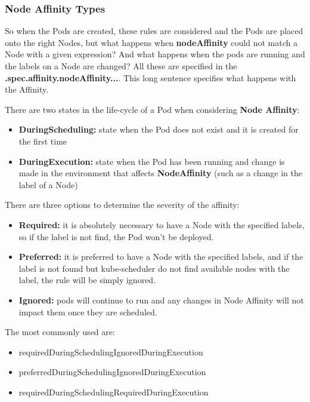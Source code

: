 \documentclass{article}
\begin{document}
\subsubsection{Node Affinity Types}

So when the Pods are created, these rules are considered and the Pods are placed onto the right Nodes, but what happens when \textbf{nodeAffinity} could not match a Node with a given expression? And what happens when the pods are running and the labels on a Node are changed? All these are specified in the \textbf{.spec.affinity.nodeAffinity...}. This long sentence specifies what happens with the Affinity.

There are two states in the life-cycle of a Pod when considering \textbf{Node Affinity}:
\begin{itemize}
    \item \textbf{DuringScheduling:} state when the Pod does not exist and it is created for the first time
    \item\textbf{DuringExecution:} state when the Pod has been running and change is made in the environment that affects \textbf{NodeAffinity} (such as a change in the label of a Node)
\end{itemize}

There are three options to determine the severity of the affinity:
\begin{itemize}
    \item \textbf{Required:} it is absolutely necessary to have a Node with the specified labels, so if the label is not find, the Pod won't be deployed.
    \item\textbf{Preferred:} it is preferred to have a Node with the specified labels, and if the label is not found but kube-scheduler do not find available nodes with the label, the rule will be simply ignored.
    \item \textbf{Ignored:} pods will continue to run and any changes in Node Affinity will not impact them once they are scheduled.
\end{itemize}

The most commonly used are:
\begin{itemize}
    \item requiredDuringSchedulingIgnoredDuringExecution
    \item preferredDuringSchedulingIgnoredDuringExecution
    \item requiredDuringSchedulingRequiredDuringExecution
\end{itemize}
\end{document}
